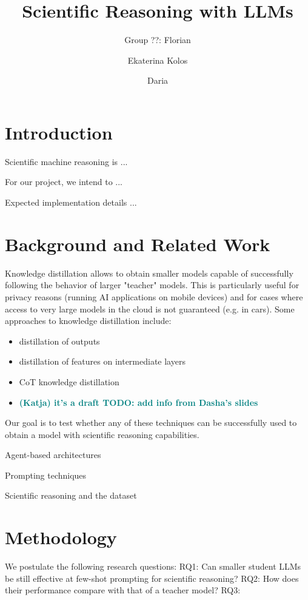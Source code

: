\documentclass{article}
\newcommand{\katja}[1]{\textbf{\textcolor{teal}{(Katja) #1}}}
\begin{document}
\title{Scientific Reasoning with LLMs}

\author{Group ??: Florian \and Ekaterina Kolos \and Daria }

\maketitle             


\section{Introduction}

Scientific machine reasoning is ... 

For our project, we intend to ...

Expected implementation details ...

\section{Background and Related Work}

Knowledge distillation allows to obtain smaller models capable of successfully following the behavior of larger "teacher" models. This is particularly useful for privacy reasons (running AI applications on mobile devices) and for cases where access to very large models in the cloud is not guaranteed (e.g. in cars). Some approaches to knowledge distillation include: \begin{itemize}
    \item distillation of outputs
    \item distillation of features on intermediate layers 
    \item CoT knowledge distillation \cite{shridhar2022distilling} 
    \item \katja{it's a draft TODO: add info from Dasha's slides}
\end{itemize}
Our goal is to test whether any of these techniques can be successfully used to obtain a model with scientific reasoning capabilities. 

Agent-based architectures \cite{lin2024swiftsage} \cite{ghafarollahi2024sciagents}

Prompting techniques \cite{schulhoff2024prompt}

Scientific reasoning and the dataset \cite{lu2022learn}

\section{Methodology}
We postulate the following research questions: 
RQ1: Can smaller student LLMs be still effective at few-shot prompting for scientific reasoning?
RQ2: How does their performance compare with that of a teacher model?
RQ3: 
\end{document}
